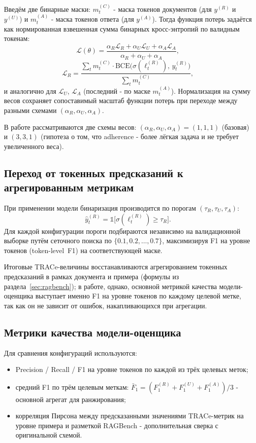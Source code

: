 Введём две бинарные маски: $m^{(C)}_t$ - маска токенов 
документов (для $y^{(R)}$ и $y^{(U)}$) и $m^{(A)}_t$ - маска токенов ответа (для $y^{(A)}$). 
Тогда функция потерь задаётся как нормированная взвешенная сумма бинарных кросс-энтропий по валидным токенам:
\[
\mathcal{L}(\theta) =
\frac{\alpha_R \mathcal{L}_R + \alpha_U \mathcal{L}_U + \alpha_A \mathcal{L}_A}
{\alpha_R + \alpha_U + \alpha_A},
\]
\[
\mathcal{L}_R = \frac{\sum_t m^{(C)}_t \cdot 
\mathrm{BCE}\bigl(\sigma(\ell^{(R)}_t),\, y^{(R)}_t\bigr)}{\sum_t m^{(C)}_t},
\]
и аналогично для $\mathcal{L}_U$, $\mathcal{L}_A$ (последний - по маске $m^{(A)}_t$).
Нормализация на сумму весов сохраняет сопоставимый масштаб функции потерь при переходе между разными схемами
$(\alpha_R, \alpha_U, \alpha_A)$.

В работе рассматриваются две схемы весов: 
$(\alpha_R, \alpha_U, \alpha_A) = (1,1,1)$ (базовая) и $(3,3,1)$ (гипотеза о том, что adherence 
- более лёгкая задача и не требует увеличенного веса).

\subsection{Переход от токенных предсказаний к агрегированным метрикам}

При применении модели бинаризация производится по порогам $(\tau_R, \tau_U, \tau_A)$:
\[
\hat{y}^{(R)}_t = \mathbb{1}\bigl[\sigma(\ell^{(R)}_t) \ge \tau_R\bigr].
\]
Для каждой конфигурации пороги подбираются независимо на валидационной
выборке путём сеточного поиска по $\{0{.}1, 0{.}2, \dots, 0{.}7\}$,
максимизируя F1 на уровне токенов (token-level~F1) на соответствующей маске.

Итоговые TRACe-величины восстанавливаются агрегированием токенных предсказаний
 в рамках документа и примера (формулы из раздела~\ref{sec:ragbench}); в работе,
 однако, основной метрикой качества модели-оценщика выступает именно F1 на уровне токенов по каждому
 целевой метке, так как он не зависит от ошибок, накапливающихся при агрегации.

\subsection{Метрики качества модели-оценщика}

Для сравнения конфигураций используются:
\begin{itemize}
  \item Precision / Recall / F1 на уровне токенов по каждой из трёх целевых меток;
  \item средний F1 по трём целевым меткам: $\bar{F}_1 = (F_1^{(R)} + F_1^{(U)} + F_1^{(A)}) / 3$ - основной агрегат для ранжирования;
  \item корреляция Пирсона между предсказанными значениями TRACe-метрик на уровне примера и разметкой RAGBench - дополнительная сверка с оригинальной схемой.
\end{itemize}


